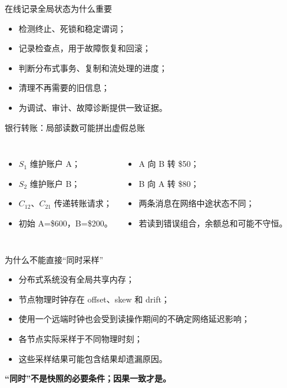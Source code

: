 \documentclass[UTF8,fontset=none,aspectratio=169,10pt]{beamer}
\begin{document}

\begin{frame}{在线记录全局状态为什么重要}
\begin{itemize}
  \item 检测终止、死锁和稳定谓词；
  \item 记录检查点，用于故障恢复和回滚；
  \item 判断分布式事务、复制和流处理的进度；
  \item 清理不再需要的旧信息；
  \item 为调试、审计、故障诊断提供一致证据。
\end{itemize}
\vfill
{}
\end{frame}

\begin{frame}{银行转账：局部读数可能拼出虚假总账}
\begin{columns}[T,onlytextwidth]
\begin{itemize}
  \item $S_1$ 维护账户 A；
  \item $S_2$ 维护账户 B；
  \item $C_{12}$、$C_{21}$ 传递转账请求；
  \item 初始 A=\$600，B=\$200。
\end{itemize}
\begin{itemize}
  \item A 向 B 转 \$50；
  \item B 向 A 转 \$80；
  \item 两条消息在网络中途状态不同；
  \item 若读到错误组合，余额总和可能不守恒。
\end{itemize}
\end{columns}
\vfill
{}
\end{frame}

\begin{frame}{为什么不能直接“同时采样”}
\begin{itemize}
  \item 分布式系统没有全局共享内存；
  \item 节点物理时钟存在 offset、skew 和 drift；
  \item 使用一个远端时钟也会受到读操作期间的不确定网络延迟影响；
  \item 各节点实际采样于不同物理时刻；
  \item 这些采样结果可能包含结果却遗漏原因。
\end{itemize}
\vfill
\begin{center}\Large\color{ADSOrange}\bfseries “同时”不是快照的必要条件；因果一致才是。\end{center}
\end{frame}
\end{document}
